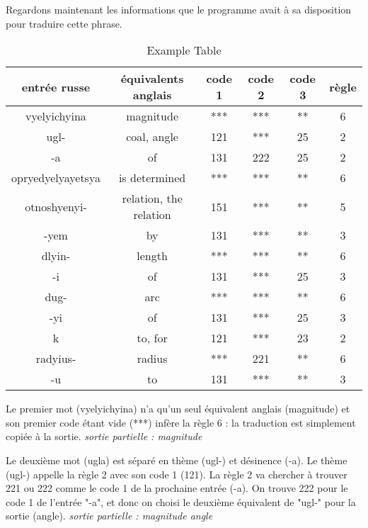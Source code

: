 \documentclass[11pt,a4paper]{report}
\begin{document}
Regardons maintenant les informations que le programme avait à sa disposition pour traduire 
cette phrase. 

\begin{table}[h] %
  \centering %
  \begin{tabular}{|c|c|c|c|c|c|} %
    \hline %
    entrée russe & équivalents anglais & code 1 & code 2 & code 3 & règle \\ %
    \hline
    vyelyichyina & magnitude & *** & *** & ** & 6 \\
    \hline
    ugl- & coal, angle & 121 & *** & 25 & 2 \\
    \hline 
    -a & of & 131 & 222 & 25 & 2 \\
    \hline 
    opryedyelyayetsya & is determined & *** & *** & ** & 6 \\
    \hline 
    otnoshyenyi- & relation, the relation & 151 & *** & ** & 5 \\ 
    \hline 
    -yem & by & 131 & *** & ** & 3 \\ 
    \hline 
    dlyin- & length & *** & *** & ** & 6 \\ 
    \hline 
    -i & of & 131 & *** & 25 & 3 \\ 
    \hline 
    dug- & arc & *** & *** & ** & 6 \\
    \hline 
    -yi & of & 131 & *** & 25 & 3 \\ 
    \hline 
    k & to, for & 121 & *** & 23 & 2 \\ 
    \hline 
    radyius- & radius & *** & 221 & ** & 6 \\ 
    \hline 
    -u & to & 131 & *** & ** & 3 \\
    \hline
  \end{tabular}
  \caption{Example Table} %
  \label{tab:example} %
\end{table}

Le premier mot (vyelyichyina) n'a qu'un seul équivalent anglais (magnitude) et son 
premier code étant vide (***) infère la règle 6 : la traduction est simplement copiée 
à la sortie. \newline 
\textit{sortie partielle : magnitude} 

Le deuxième mot (ugla) est séparé en thème (ugl-) et désinence (-a). 
Le thème (ugl-) appelle la règle 2 avec son code 1 (121). La règle 2 va chercher à trouver 221 ou 222 
comme le code 1 de la prochaine entrée (-a). On trouve 222 pour le code 1 de l'entrée 
"-a", et donc on choisi le deuxième équivalent de "ugl-" pour la sortie (angle). \newline 
\textit{sortie partielle : magnitude angle}
\end{document}
